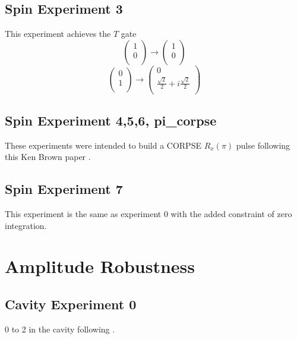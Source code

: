 \documentclass[letterpaper, 12pt]{article}
\begin{document}
  \subsection{Spin Experiment 3}
  This experiment achieves the $T$ gate
  \[
    \begin{pmatrix}
      1\\
      0\\
    \end{pmatrix}
    \rightarrow
    \begin{pmatrix}
      1\\
      0\\
    \end{pmatrix}
\]
\[
    \begin{pmatrix}
      0\\
      1\\
    \end{pmatrix}
    \rightarrow
    \begin{pmatrix}
      0\\
      \frac{\sqrt{2}}{2} + i\frac{\sqrt{2}}{2}\\
    \end{pmatrix}
 \]

  \subsection{Spin Experiment 4,5,6, pi\_corpse}
  These experiments were intended to build a CORPSE $R_{x}(\pi)$ pulse
  following this Ken Brown paper \cite{merrill2014progress}.


  \subsection{Spin Experiment 7}
  This experiment is the same as experiment 0 with the added constraint of
  zero integration.


  \section{Amplitude Robustness}

  \subsection{Cavity Experiment 0}
  0 to 2 in the cavity following \cite{heeres2017implementing}.
  
  



\end{document}
